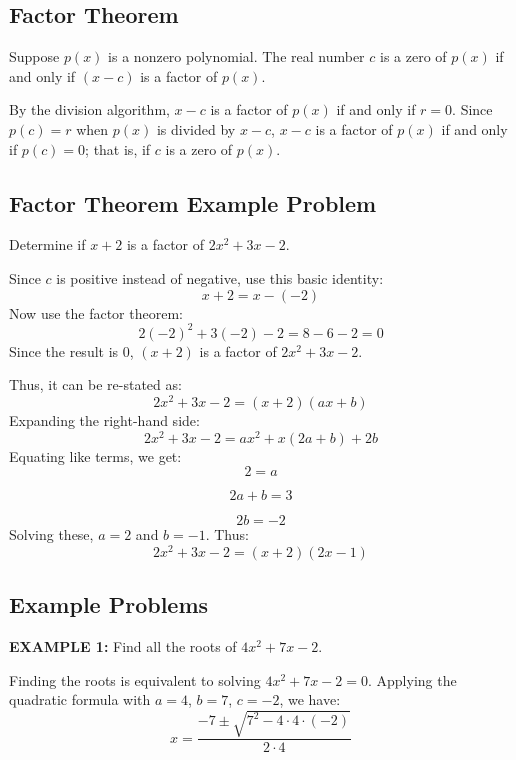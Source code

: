 \subsection{Factor Theorem}
\label{sss:fact-8420}

Suppose $p(x)$ is a nonzero polynomial. The real number $c$ is a zero of $p(x)$ if and only if $(x - c)$ is a factor of $p(x)$.

By the division algorithm, $x - c$ is a factor of $p(x)$ if and only if $r = 0$. Since $p(c) = r$ when $p(x)$ is divided by $x - c$, $x - c$ is a factor of $p(x)$ if and only if $p(c) = 0$; that is, if $c$ is a zero of $p(x)$.

\subsection{Factor Theorem Example Problem}
\label{sss:fact-0b0b}

Determine if $x + 2$ is a factor of $2x^2 + 3x - 2$.

Since $c$ is positive instead of negative, use this basic identity:
\[
x + 2 = x - (-2)
\]
Now use the factor theorem:
\[
2(-2)^2 + 3(-2) - 2 = 8 - 6 - 2 = 0
\]
Since the result is 0, $(x + 2)$ is a factor of $2x^2 + 3x - 2$.

Thus, it can be re-stated as:
\[
2x^2 + 3x - 2 = (x + 2)(ax + b)
\]
Expanding the right-hand side:
\[
2x^2 + 3x - 2 = ax^2 + x(2a + b) + 2b
\]
Equating like terms, we get:
\[
2 = a
\]

\[
2a + b = 3
\]

\[
2b = -2
\]
Solving these, $a = 2$ and $b = -1$. Thus:
\[
2x^2 + 3x - 2 = (x + 2)(2x - 1)
\]

\subsection{Example Problems}
\label{sss:exam-b742}

\textbf{EXAMPLE 1:} Find all the roots of $4x^2 + 7x - 2$.

Finding the roots is equivalent to solving $4x^2 + 7x - 2 = 0$. Applying the quadratic formula with $a = 4$, $b = 7$, $c = -2$, we have:
\[
x = \frac{-7 \pm \sqrt{7^2 - 4 \cdot 4 \cdot (-2)}}{2 \cdot 4}
\]

